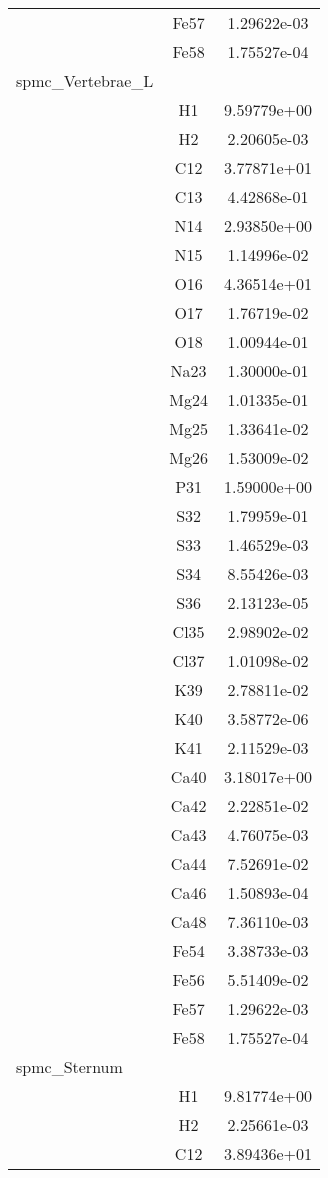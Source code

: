\begin{centering}
\begin{longtable}{l c c}
& Fe57 & 1.29622e-03 \\ 
& Fe58 & 1.75527e-04 \\ 
\hline
spmc\_Vertebrae\_L & & \\
\hline
& H1 & 9.59779e+00 \\ 
& H2 & 2.20605e-03 \\ 
& C12 & 3.77871e+01 \\ 
& C13 & 4.42868e-01 \\ 
& N14 & 2.93850e+00 \\ 
& N15 & 1.14996e-02 \\ 
& O16 & 4.36514e+01 \\ 
& O17 & 1.76719e-02 \\ 
& O18 & 1.00944e-01 \\ 
& Na23 & 1.30000e-01 \\ 
& Mg24 & 1.01335e-01 \\ 
& Mg25 & 1.33641e-02 \\ 
& Mg26 & 1.53009e-02 \\ 
& P31 & 1.59000e+00 \\ 
& S32 & 1.79959e-01 \\ 
& S33 & 1.46529e-03 \\ 
& S34 & 8.55426e-03 \\ 
& S36 & 2.13123e-05 \\ 
& Cl35 & 2.98902e-02 \\ 
& Cl37 & 1.01098e-02 \\ 
& K39 & 2.78811e-02 \\ 
& K40 & 3.58772e-06 \\ 
& K41 & 2.11529e-03 \\ 
& Ca40 & 3.18017e+00 \\ 
& Ca42 & 2.22851e-02 \\ 
& Ca43 & 4.76075e-03 \\ 
& Ca44 & 7.52691e-02 \\ 
& Ca46 & 1.50893e-04 \\ 
& Ca48 & 7.36110e-03 \\ 
& Fe54 & 3.38733e-03 \\ 
& Fe56 & 5.51409e-02 \\ 
& Fe57 & 1.29622e-03 \\ 
& Fe58 & 1.75527e-04 \\ 
\hline
spmc\_Sternum & & \\
\hline
& H1 & 9.81774e+00 \\ 
& H2 & 2.25661e-03 \\ 
& C12 & 3.89436e+01 \\ 

\end{longtable}
\end{centering}

